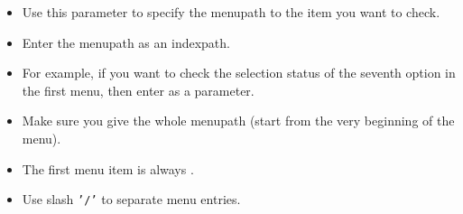 \begin{itemize}
\item Use this parameter to specify the menupath to the item you want to check.
\item Enter the menupath as an indexpath.
\item For example, if you want to check the selection status of the seventh option in the first menu, then enter  as a parameter.
\item Make sure you give the whole menupath (start from the very beginning of the menu).
\item The first menu item is always . 
\item Use slash {\tt '/'} to separate menu entries.
\end{itemize}
